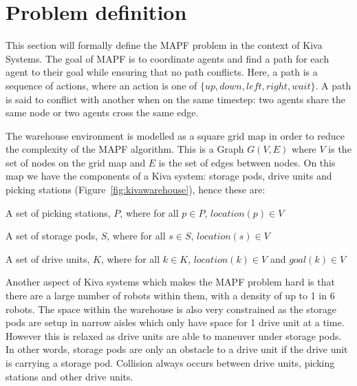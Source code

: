 \documentclass[a4paper,11pt]{article}
\begin{document}

%

\section{Problem definition} \label{sec:problemdef}
This section will formally define the MAPF problem in the context of Kiva Systems. The goal of MAPF is to coordinate agents and find a path for each agent to their goal while ensuring that no path conflicts. Here, a path is a sequence of actions, where an action is one of $\{up, down, left, right, wait\}$. A path is said to conflict with another when on the same timestep: two agents share the same node or two agents cross the same edge.

The warehouse environment is modelled as a square grid map in order to reduce the complexity of the MAPF algorithm. This is a  Graph $G(V, E)$ where $V$ is the set of nodes on the grid map and $E$ is the set of edges between nodes. On this map we have the components of a Kiva system: storage pods, drive units and picking stations (Figure~\ref{fig:kivawarehouse}), hence these are:
\begin{compactitem}
	\item A set of picking stations, $P$, where for all $p \in P$, $location (p) \in V$
	\item A set of storage pods, $S$, where for all $s \in S$, $location (s) \in V$
	\item A set of drive units, $K$, where for all $k \in K$, $location(k) \in V$ and $goal(k) \in V$
\end{compactitem}

\noindent Another aspect of Kiva systems which makes the MAPF problem hard is that there are a large number of robots within them, with a density of up to 1 in 6 robots. The space within the warehouse is also very constrained as the storage pods are setup in narrow aisles which only have space for 1 drive unit at a time. However this is relaxed as drive units are able to maneuver under storage pods. In other words, storage pods are only an obstacle to a drive unit if the drive unit is carrying a storage pod. Collision always occurs between drive units, picking stations and other drive units.
\end{document}
